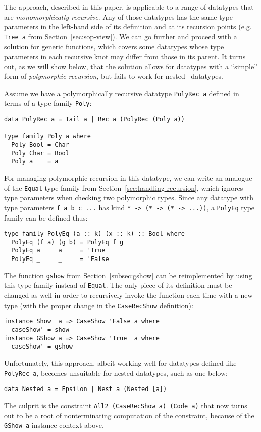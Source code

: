 \documentclass[runningheads]{llncs}
\newcommand{\K}[1]{\lstinline{#1}}
\begin{document}
The approach, described in this paper, is applicable to a range of datatypes that are \emph{monomorphically recursive}. Any of those datatypes has the same type parameters in the left-hand side of its definition and at its recursion points (e.g. \K{Tree a} from Section~\ref{sec:sop-view}). We can go further and proceed with a solution for generic functions, which covers some datatypes whose type parameters in each recursive knot may differ from those in its parent. It turns out, as we will show below, that the solution allows for datatypes with a ``simple'' form of \emph{polymorphic recursion}, but fails to work for nested~\cite{Bird1998} datatypes.

Assume we have a polymorphically recursive datatype \K{PolyRec a} defined in terms of a type family \K{Poly}:
\begin{lstlisting}
data PolyRec a = Tail a | Rec a (PolyRec (Poly a))

type family Poly a where
  Poly Bool = Char
  Poly Char = Bool
  Poly a    = a
\end{lstlisting}

For managing polymorphic recursion in this datatype, we can write an analogue of the \K{Equal} type family from Section~\ref{sec:handling-recursion}, which ignores type parameters when checking two polymorphic types. Since any datatype with type parameters \K{f a b c ...} has kind \K{* -> (* -> (* -> ...))}, a \K{PolyEq} type family can be defined thus:
\begin{lstlisting}
type family PolyEq (a :: k) (x :: k) :: Bool where
  PolyEq (f a) (g b) = PolyEq f g
  PolyEq a     a     = 'True
  PolyEq _     _     = 'False
\end{lstlisting}

The function \K{gshow} from Section~\ref{subsec:gshow} can be reimplemented by using this type family instead of \K{Equal}. The only piece of its definition must be changed as well in order to recursively invoke the function each time with a new type (with the proper change in the \K{CaseRecShow} definition):
\begin{lstlisting}
instance Show  a => CaseShow 'False a where
  caseShow' = show
instance GShow a => CaseShow 'True  a where
  caseShow' = gshow
\end{lstlisting}

Unfortunately, this approach, albeit working well for datatypes defined like \K{PolyRec a}, becomes unsuitable for nested datatypes, such as one below:
\begin{lstlisting}
data Nested a = Epsilon | Nest a (Nested [a])
\end{lstlisting}
The culprit is the constraint \K{All2 (CaseRecShow a) (Code a)} that now turns out to be a root of nonterminating computation of the constraint, because of the \K{GShow a} instance context above.
\end{document}

